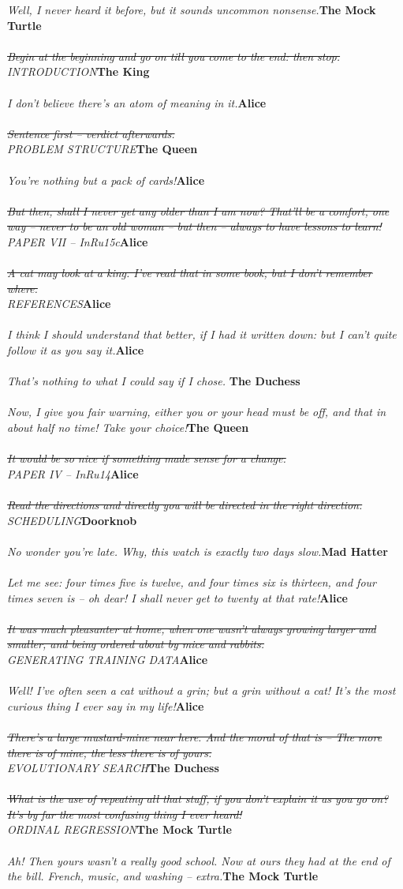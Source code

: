\documentclass{hi-thesis}
\renewcommand{\quote}[2]{\noindent \emph{#2}\hfill{\bf #1}\\\\}
\begin{document}
\quote{The Mock Turtle}{Well, I never heard it before, but it sounds uncommon nonsense.}
\quote{The King}{\st{Begin at the beginning and go on till you come to the end: then stop.} \\INTRODUCTION}
\quote{Alice}{I don't believe there's an atom of meaning in it.}
\quote{The Queen}{\st{Sentence first -- verdict afterwards.}\\PROBLEM STRUCTURE}
\quote{Alice}{You're nothing but a pack of cards!}
\quote{Alice}{\st{But then, shall I never get any older than I am now? That'll 
be a comfort, one way -- never to be an old woman -- but then -- always to have 
lessons to learn!}\\PAPER VII -- InRu15c}
\quote{Alice}{\st{A cat may look at a king. I've read that in some book, but I don't remember where.}\\REFERENCES}
\quote{Alice}{I think I should understand that better, if I had it written down: but I can't quite follow it as you say it.}
\quote{The Duchess}{That's nothing to what I could say if I chose. }
\quote{The Queen}{Now, I give you fair warning, either you or your head must be off, and that in about half no time! Take your choice!}
\quote{Alice}{\st{It would be so nice if something made sense for a 
change.}\\PAPER IV -- InRu14}
\quote{Doorknob}{\st{Read the directions and directly you will be directed in the right direction.}\\SCHEDULING}
\quote{Mad Hatter}{No wonder you're late. Why, this watch is exactly two days slow.}
\quote{Alice}{Let me see: four times five is twelve, and four times six is thirteen, and four times seven is -- oh dear! I shall never get to twenty at that rate!}
\quote{Alice}{\st{It was much pleasanter at home, when one wasn't always growing larger and smaller, and being ordered about by mice and rabbits.}\\GENERATING TRAINING DATA}
\quote{Alice}{Well! I've often seen a cat without a grin; but a grin without a cat! It's the most curious thing I ever say in my life!}
\quote{The Duchess}{\st{There's a large mustard-mine near here. And the moral of that is -- The more there is of mine, the less there is of yours.}\\EVOLUTIONARY SEARCH}
\quote{The Mock Turtle}{\st{What is the use of repeating all that stuff, if you don't explain it as you go on? It's by far the most confusing thing I ever heard!}\\ORDINAL REGRESSION}
\quote{The Mock Turtle}{Ah! Then yours wasn't a really good school. Now at ours they had at the end of the bill. French, music, and washing -- extra.}
\end{document}
